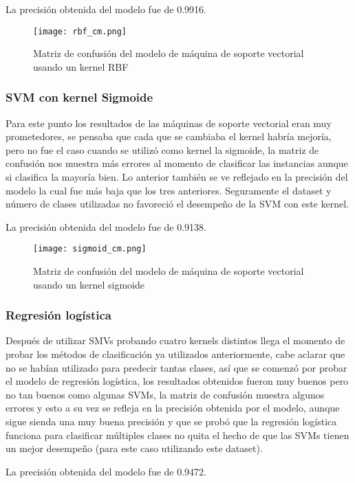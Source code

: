 \documentclass[sigconf,authorversion,nonacm]{acmart}
\begin{document}
La precisión obtenida del modelo fue de 0.9916.

\begin{figure}[H]
  \centering
  \texttt{[image: rbf\_cm.png]}
  \caption{Matriz de confusión del modelo de máquina de soporte vectorial usando un kernel RBF}
\end{figure}

\subsubsection{SVM con kernel Sigmoide}
Para este punto los resultados de las máquinas de soporte vectorial eran muy prometedores, se pensaba que cada que se cambiaba el kernel habría mejoría, pero no fue el caso cuando se utilizó como kernel la sigmoide, la matriz de confusión nos muestra más errores al momento de clasificar las instancias aunque si clasifica la mayoría bien. Lo anterior también se ve reflejado en la precisión del modelo la cual fue más baja que los tres anteriores. Seguramente el dataset y número de clases utilizadas no favoreció el desempeño de la SVM con este kernel.

La precisión obtenida del modelo fue de 0.9138.

\begin{figure}[H]
  \centering
  \texttt{[image: sigmoid\_cm.png]}
  \caption{Matriz de confusión del modelo de máquina de soporte vectorial usando un kernel sigmoide}
\end{figure}

\subsubsection{Regresión logística}
Después de utilizar SMVs probando cuatro kernels distintos llega el momento de probar los métodos de clasificación ya utilizados anteriormente, cabe aclarar que no se habían utilizado para predecir tantas clases, así que se comenzó por probar el modelo de regresión logística, los resultados obtenidos fueron muy buenos pero no tan buenos como algunas SVMs, la matriz de confusión muestra algunos errores y esto a su vez se refleja en la precisión obtenida por el modelo, aunque sigue sienda una muy buena precisión y que se probó que la regresión logística funciona para clasificar múltiples clases no quita el hecho de que las SVMs tienen un mejor desempeño (para este caso utilizando este dataset).

La precisión obtenida del modelo fue de 0.9472.
\end{document}
